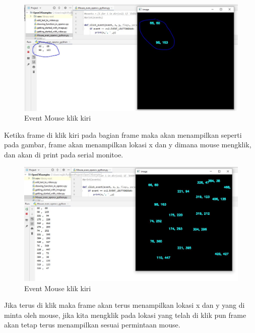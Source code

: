 \newpage
\begin{figure}[ht]
\centering
\includegraphics[scale=0.42]{figures/2,20,1.jpg}
\caption{Event Mouse klik kiri}
\label{contoh}
\end{figure}
Ketika frame di klik kiri pada bagian frame maka akan menampilkan seperti pada gambar, frame akan menampilkan lokasi x dan y dimana mouse mengklik, dan akan di print pada serial monitoe.

\newpage
\begin{figure}[ht]
\centering
\includegraphics[scale=0.42]{figures/2,20,2.jpg}
\caption{Event Mouse klik kiri}
\label{contoh}
\end{figure}
Jika terus di klik maka frame akan terus menampilkan lokasi x dan y yang di minta oleh mouse, jika kita mengklik pada lokasi yang telah di klik pun frame akan tetap terus menampilkan sesuai permintaan mouse.



\newpage
